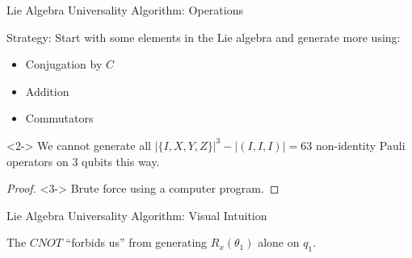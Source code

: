 \begin{frame}{Lie Algebra Universality Algorithm: Operations}

Strategy: Start with some elements in the Lie algebra and generate more using:
\begin{itemize}
    \item Conjugation by $C$
    \item Addition
    \item Commutators
\end{itemize}

\begin{fact}<2->
We cannot generate all $|\{I,X,Y,Z\}|^3 - |(I,I,I)| = 63$ non-identity Pauli operators on $3$ qubits this way.
\end{fact}

\begin{proof}<3->
Brute force using a computer program.
\end{proof}

\end{frame}

\begin{frame}{Lie Algebra Universality Algorithm: Visual Intuition}

The $CNOT$ ``forbids us'' from generating $R_x(\theta_1)$ alone on $q_1$.
\begin{center}
\end{center}


\end{frame}